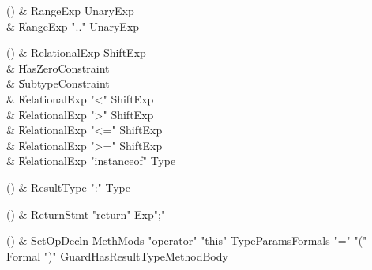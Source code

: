 \begin{bbgrammarappendix}{4.2in}

() & RangeExp \label{prod:RangeExp}  \: UnaryExp  \\

 &    \| RangeExp  \xcd".." UnaryExp  \\

\end{bbgrammarappendix}

\begin{bbgrammarappendix}{3.7in}

() & RelationalExp \label{prod:RelationalExp}  \: ShiftExp  \\

 &    \| HasZeroConstraint \\
 &    \| SubtypeConstraint \\
 &    \| RelationalExp \xcd"<" ShiftExp \\
 &    \| RelationalExp \xcd">" ShiftExp \\
 &    \| RelationalExp \xcd"<=" ShiftExp \\
 &    \| RelationalExp \xcd">=" ShiftExp \\
 &    \| RelationalExp \xcd"instanceof" Type \\

\end{bbgrammarappendix}

\begin{bbgrammarappendix}{4.0in}

() & ResultType \label{prod:ResultType}  \: \xcd":" Type  \\


\end{bbgrammarappendix}

\begin{bbgrammarappendix}{4.0in}

() & ReturnStmt \label{prod:ReturnStmt}  \: \xcd"return" Exp\opt \xcd";"  \\


\end{bbgrammarappendix}

\begin{bbgrammarappendix}{4.0in}

() & SetOpDecln \label{prod:SetOpDecln}  \: MethMods \xcd"operator" \xcd"this" TypeParams\opt Formals \xcd"=" \xcd"(" Formal  \xcd")" Guard\opt HasResultType\opt MethodBody  \\


\end{bbgrammarappendix}

